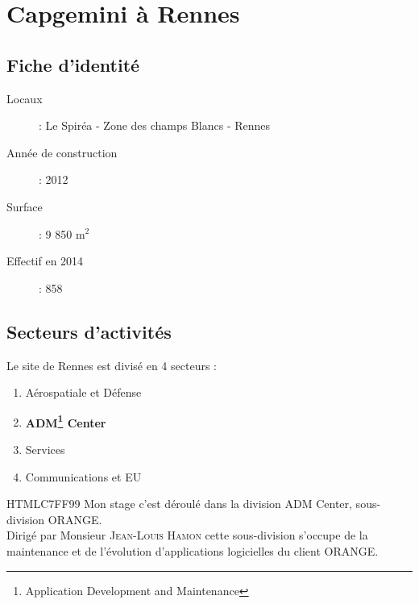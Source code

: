 \chapter{Capgemini à Rennes}
\section{Fiche d'identité}
\begin{description}
  \item[Locaux] : Le Spiréa - Zone des champs Blancs - Rennes
  \item[Année de construction] : 2012
  \item[Surface] : 9 850 m$^2$
  \item[Effectif en 2014] : 858
\end{description}
\begin{figure}[h]
\end{figure}
\newpage
\section{Secteurs d'activités}
Le site de Rennes est divisé en 4 secteurs :
\begin{enumerate}
\item Aérospatiale et Défense
\item \textbf{ADM\footnote{Application Development and Maintenance} Center}
\item Services
\item Communications et EU\\
\end{enumerate}

\begin{colbox}{{HTML}{C7FF99}}{}
  Mon stage c'est déroulé dans la division ADM Center, sous-division ORANGE.\\
  Dirigé par Monsieur \textsc{Jean-Louis Hamon}
  cette sous-division s'occupe de la maintenance et de l'évolution d'applications logicielles du client ORANGE.
\end{colbox}

